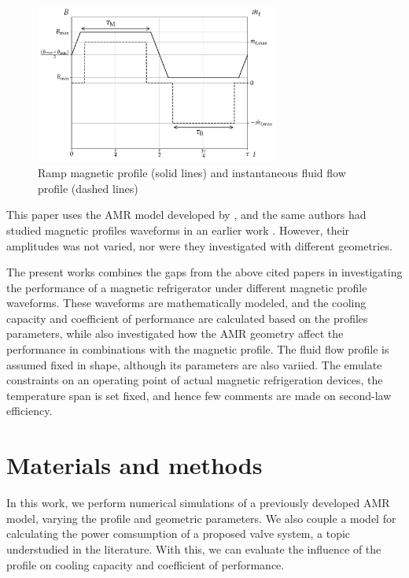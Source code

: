 \documentclass[referee]{svjour3}
\begin{document}
\begin{figure}[!ht]
  \centering
  \includegraphics[width=8cm]{profiles_rm_and_flow_instantaneous}
  \caption{Ramp magnetic profile (solid lines) and instantaneous fluid flow profile (dashed lines)}
  \label{fig:sync}
\end{figure}

This paper uses the AMR model developed by \cite{bib:trevizoli16_perfor_model}, and the same authors had studied magnetic profiles waveforms in an earlier work \cite{bib:asme-mce}. However, their amplitudes was not varied, nor were they investigated with different geometries.

The present works combines the gaps from the above cited papers in investigating the performance of a magnetic refrigerator under different magnetic profile waveforms. These waveforms are mathematically modeled, and the cooling capacity and coefficient of performance are calculated based on the profiles parameters, while also investigated how the AMR geometry affect the performance in combinations with the magnetic profile. The fluid flow profile is assumed fixed in shape, although its parameters are also variied. The emulate constraints on an operating point of actual magnetic refrigeration devices, the temperature span is set fixed, and hence few comments are made on second-law efficiency.



\section{Materials and methods}
\label{sec:materials-methods}

In this work, we perform numerical simulations of a previously developed AMR model, varying the profile and geometric parameters. We also couple a model for calculating  the power comsumption of a proposed valve system, a topic understudied in the literature. With this, we can evaluate the influence of the profile on cooling capacity and coefficient of performance.
\end{document}
